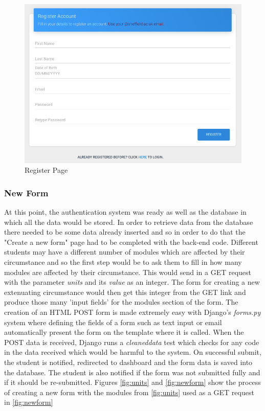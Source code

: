 \documentclass[../main.tex]{subfiles}
\begin{document}
\begin{figure}[H]
	\begin{center}
        \includegraphics[scale=1]
        {images/register.png}
        \caption{\label{fig:register} Register Page}
     \end{center} 
      \end{figure}
 

\subsubsection{New Form}
At this point, the authentication system was ready as well as the database in which all the data would be stored. In order to retrieve data from the database there needed to be some data already inserted and so in order to do that the "Create a new form" page had to be completed with the back-end code. Different students may have a different number of modules which are affected by their circumstance and so the first step would be to ask them to fill in how many modules are affected by their circumstance. This would send in a GET request with the parameter \textit{units} and its \textit{value} as an integer. The form for creating a new extenuating circumstance would then get this integer from the GET link and produce those many 'input fields' for the modules section of the form. The creation of an HTML POST form is made extremely easy with Django's \textit{forms.py} system where defining the fields of a form such as text input or email automatically present the form on the template where it is called. When the POST data is received, Django runs a \textit{cleaneddata} test which checks for any code in the data received which would be harmful to the system. On successful submit, the student is notified, redirected to dashboard and the form data is saved into the database. The student is also notified if the form was not submitted fully and if it should be re-submitted. Figures \ref{fig:units} and \ref{fig:newform} show the process of creating a new form with the modules from \ref{fig:units} used as a GET request in \ref{fig:newform}
\end{document}
